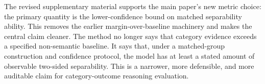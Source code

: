 \documentclass[10pt,conference]{IEEEtran}
\theoremstyle{remark}
\begin{document}
The revised supplementary material supports the main paper's new metric choice: the primary quantity is the lower-confidence bound on matched separability ability.  This removes the earlier margin-over-baseline machinery and makes the central claim cleaner.  The method no longer says that category evidence exceeds a specified non-semantic baseline.  It says that, under a matched-group construction and confidence protocol, the model has at least a stated amount of observable two-sided separability.  This is a narrower, more defensible, and more auditable claim for category-outcome reasoning evaluation.



\end{document}
